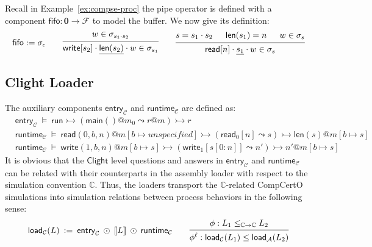 \documentclass[acmsmall,screen,review,nonacm]{acmart}
\newcommand{\kw}[1]{\ensuremath{ \mathsf{#1} }}
\begin{document}
Recall in Example~\ref{ex:compse-proc}
the pipe operator
is defined with
a component $\kw{fifo} : \mathbf{0} \rightarrow \mathcal{F}$ to model
the buffer.
We now give its definition:
\[
  \kw{fifo} := \sigma_\epsilon
  \qquad
  \begin{prooftree}
    \hypo{w \in \sigma_{s_1 \cdot s_2}}
    \infer1{\kw{write}[s_2] \cdot \underline{\kw{len}(s_2)} \cdot w \in \sigma_{s_1}}
  \end{prooftree}
  \qquad
  \begin{prooftree}
    \hypo{s = s_1 \cdot s_2}
    \hypo{\kw{len}(s_1) = n}
    \hypo{w \in \sigma_s}
    \infer3{\kw{read}[n] \cdot \underline{s_1} \cdot w \in \sigma_s}
  \end{prooftree}
\]

\subsection{Clight Loader}

The auxiliary components
$\kw{entry}_\mathcal{C}$ and
$\kw{runtime}_\mathcal{C}$
are defined as:
{\small
\begin{align*}
  & \kw{entry}_\mathcal{C} \:\vDash\:
  \kw{run} \rightarrowtail
  (\kw{main}()@m_0 \leadsto r@m) \rightarrowtail r \\
  & \kw{runtime}_\mathcal{C} \:\vDash\:
  \kw{read}(0, b, n)@m[b \mapsto unspecified]
   \rightarrowtail (\kw{read}_0[n] \leadsto s)
    \rightarrowtail \kw{len}(s)@m[b \mapsto s] \\
  & \kw{runtime}_\mathcal{C} \:\vDash\:
    \kw{write}(1, b, n)@m[b \mapsto s]
   \rightarrowtail
  (\kw{write}_1[s[0:n]] \leadsto n')
  \rightarrowtail n'@m[b \mapsto s]
\end{align*}}%
It is obvious that
the \kw{Clight} level
questions and answers
in $\kw{entry}_\mathcal{C}$ and $\kw{runtime}_\mathcal{C}$
can be related
with their counterparts in the assembly loader
with respect to
the simulation convention $\mathbb{C}$.
Thus, the loaders
transport
the $\mathbb{C}$-related CompCertO simulations
into
simulation relations
between process behaviors
in the following sense:
\[
  \kw{load}_\mathcal{C}(L)
  \::=\: \kw{entry}_\mathcal{C} \: \odot \: \llbracket L \rrbracket
  \: \odot \: \kw{runtime}_\mathcal{C}
  \qquad
  \begin{prooftree}
    \hypo{\phi: L_1 \le_{\mathbb{C} \rightarrow \mathbb{C}} L_2}
    \infer1{\phi^\ell: \kw{load}_\mathcal{C}(L_1) \le
      \kw{load}_\mathcal{A}(L_2)}
  \end{prooftree}
\]
\end{document}
